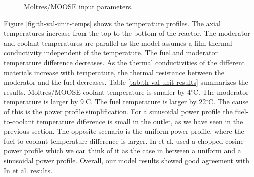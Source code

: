 \begin{figure}[htbp!]
	\centering
	\hfill
  \caption{Moltres/MOOSE input parameters.}
	\label{fig:th-val-unit-model}
\end{figure}

Figure \ref{fig:th-val-unit-temps} shows the temperature profiles.
The axial temperatures increase from the top to the bottom of the reactor.
The moderator and coolant temperatures are parallel as the model assumes a film thermal conductivity independent of the temperature.
The fuel and moderator temperature difference decreases.
As the thermal conductivities of the different materials increase with temperature, the thermal resistance between the moderator and the fuel decreases.
Table \ref{tab:th-val-unit-results} summarizes the results.
Moltres/MOOSE coolant temperature is smaller by 4$^{\circ}$C.
The moderator temperature is larger by 9$^{\circ}$C.
The fuel temperature is larger by 22$^{\circ}$C.
The cause of this is the power profile simplification.
For a sinusoidal power profile the fuel-to-coolant temperature difference is small in the outlet, as we have seen in the previous section.
The opposite scenario is the uniform power profile, where the fuel-to-coolant temperature difference is larger.
In et al. used a chopped cosine power profile which we can think of it as the case in between a uniform and a sinusoidal power profile.
Overall, our model results showed good agreement with In et al. results.

